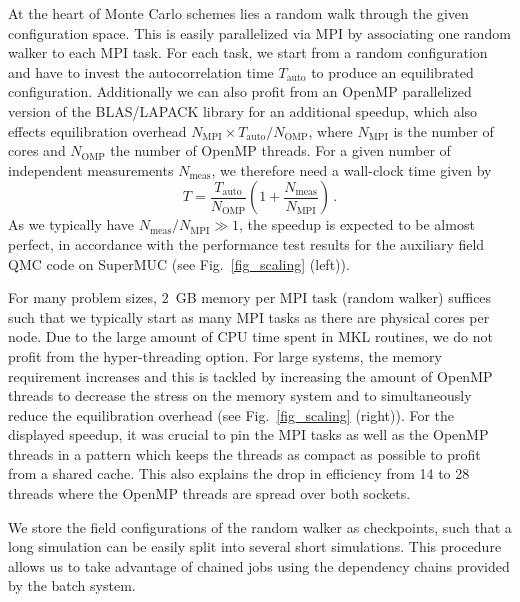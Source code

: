 At the heart of Monte Carlo schemes lies a random walk through the given configuration space. This is easily parallelized via MPI by associating one random walker to each MPI task. For each task, we start from a random configuration and have to invest the autocorrelation time $T_\mathrm{auto}$ to produce an equilibrated configuration.
Additionally we can also profit from an OpenMP parallelized version of the BLAS/LAPACK library for an additional speedup, which also effects equilibration overhead $N_\text{MPI}\times T_\text{auto} / N_\text{OMP}$, where $N_{\text{MPI}}$ is the number of cores and $N_{\text{OMP}}$ the number of OpenMP threads.
For a given number of independent measurements  $N_\text{meas}$, we  therefore need a wall-clock time given by
\begin{equation}\label{eqn:scaling}
T  =  \frac{T_\text{auto}}{N_\text{OMP}} \left( 1   +    \frac{N_\text{meas}}{N_\text{MPI}}  \right) \,.
\end{equation}
As we typically have $ N_\text{meas}/N_\text{MPI} \gg 1 $, 
the speedup is expected to be almost perfect, in accordance with
the performance test results for the auxiliary field
QMC code  on SuperMUC (see Fig.~\ref{fig_scaling} (left)).

For many problem sizes, 2~GB memory per MPI task (random walker) suffices such that we typically start as many MPI tasks as there are physical cores per node. Due to the large amount of CPU time spent in MKL routines, we do not profit from the hyper-threading option. For large systems, the memory requirement increases and this is tackled by increasing the amount of OpenMP threads to decrease the stress on the memory system and to simultaneously reduce the equilibration overhead (see Fig.~\ref{fig_scaling} (right)). For the displayed speedup, it was crucial to pin the MPI tasks as well as the OpenMP threads in a pattern which keeps the threads as compact as possible to profit from a shared cache. This also explains the drop in efficiency from 14 to 28 threads where the OpenMP threads are spread over both sockets. 

We store the field configurations of the random walker as checkpoints, such that a long simulation can be easily split into several short simulations. This procedure allows us to take advantage of chained jobs using the dependency chains provided by the batch system.

